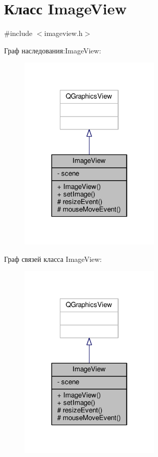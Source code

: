 \hypertarget{class_image_view}{}\section{Класс Image\+View}
\label{class_image_view}


{\ttfamily \#include $<$imageview.\+h$>$}



Граф наследования\+:Image\+View\+:
\nopagebreak
\begin{figure}[H]
\begin{center}
\leavevmode
\includegraphics[width=190pt]{df/dd0/class_image_view__inherit__graph}
\end{center}
\end{figure}


Граф связей класса Image\+View\+:
\nopagebreak
\begin{figure}[H]
\begin{center}
\leavevmode
\includegraphics[width=190pt]{d5/d39/class_image_view__coll__graph}
\end{center}
\end{figure}
